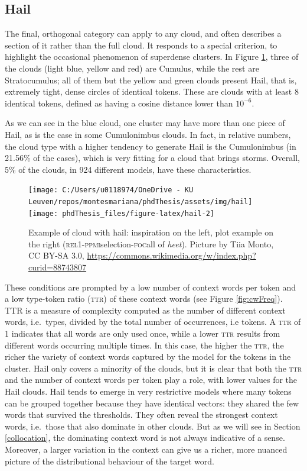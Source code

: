 \documentclass[
]{book}
\begin{document}
\hypertarget{hail}{%
\subsection{Hail}\label{hail}}

The final, orthogonal category can apply to any cloud, and often describes a section of it rather than the full cloud. It responds to a special criterion, to highlight the occasional phenomenon of superdense clusters. In Figure \ref{fig:hail}, three of the clouds (light blue, yellow and red) are Cumulus, while the rest are Stratocumulus; all of them but the yellow and green clouds present Hail, that is, extremely tight, dense circles of identical tokens. These are clouds with at least 8 identical tokens, defined as having a cosine distance lower than \(\ensuremath{10^{-6}}\).

As we can see in the blue cloud, one cluster may have more than one piece of Hail, as is the case in some Cumulonimbus clouds. In fact, in relative numbers, the cloud type with a higher tendency to generate Hail is the Cumulonimbus
(in 21.56\% of the cases), which is very fitting for a cloud that brings storms. Overall,
5\% of the clouds, in 924 different models, have these characteristics.



\begin{figure}
\texttt{[image: C:/Users/u0118974/OneDrive - KU Leuven/repos/montesmariana/phdThesis/assets/img/hail]} \texttt{[image: phdThesis\_files/figure-latex/hail-2]} \caption{Example of cloud with hail: inspiration on the left, plot example on the right (\textsc{rel}1-\textsc{ppmi}selection-\textsc{foc}all of \emph{heet}). Picture by Tiia Monto, CC BY-SA 3.0, \url{https://commons.wikimedia.org/w/index.php?curid=88743807}}\label{fig:hail}
\end{figure}

These conditions are prompted by a low number of context words per token and a low type-token ratio (\textsc{ttr}) of these context words (see Figure \ref{fig:cwFreq}).
TTR is a measure of complexity computed as the number of different context words, i.e.~types, divided by the total number of occurrences, i.e tokens. A \textsc{ttr} of 1 indicates that all words are only used once, while a lower \textsc{ttr} results from different words occurring multiple times. In this case, the higher the \textsc{ttr}, the richer the variety of context words captured by the model for the tokens in the cluster.
Hail only covers a minority of the clouds, but it is clear that both the \textsc{ttr} and the number of context words per token play a role, with lower values for the Hail clouds.
Hail tends to emerge in very restrictive models where many tokens can be grouped together because they have identical vectors: they shared the few words that survived the thresholds. They often reveal the strongest context words, i.e.~those that also dominate in other clouds. But as we will see in Section \ref{collocation}, the dominating context word is not always indicative of a sense. Moreover, a larger variation in the context can give us a richer, more nuanced picture of the distributional behaviour of the target word.
\end{document}
